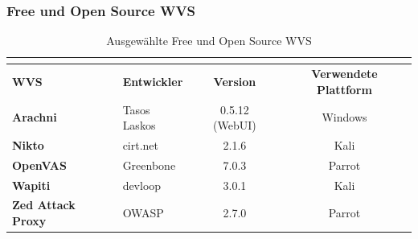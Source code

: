 \documentclass[12pt,oneside,a4paper,parskip]{scrbook}
\begin{document}
    \subsubsection{Free und Open Source WVS}
      \begin{table}[H]
        \centering
          \begin{tabular}{|l|l|c|c|}
            \multicolumn{1}{l}{}      & \multicolumn{1}{l}{} & \multicolumn{1}{l}{} & \multicolumn{1}{l}{}          \\
            \hline
            \textbf{WVS}              & \textbf{Entwickler}  & \textbf{Version}     & \textbf{Verwendete Plattform}  \\
            \hline
            \textbf{Arachni}          & Tasos Laskos         & 0.5.12 (WebUI)       & Windows                       \\
            \hline
            \textbf{Nikto}            & cirt.net             & 2.1.6                & Kali                          \\
            \hline
            \textbf{OpenVAS}          & Greenbone            & 7.0.3                & Parrot                        \\
            \hline
            \textbf{Wapiti}           & devloop              & 3.0.1                & Kali                          \\
            \hline
            \textbf{Zed Attack Proxy} & OWASP                & 2.7.0                & Parrot                        \\
            \hline
          \end{tabular}
        \caption[Ausgewählte Free und Open Source WVS]{Ausgewählte Free und Open Source WVS}
      \end{table}
\end{document}
